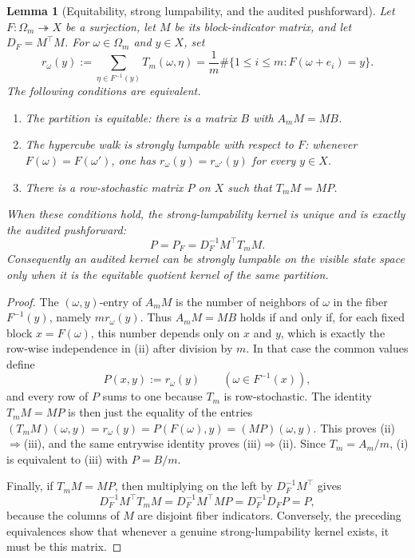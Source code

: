 \documentclass[12pt,a4paper]{article}
\theoremstyle{plain}
\newtheorem{lemma}[theorem]{Lemma}
\theoremstyle{definition}
\numberwithin{equation}{section}
\begin{document}
\begin{lemma}[Equitability, strong lumpability, and the audited pushforward]\label{lem:equitable-strong-lumpability-audited-pushforward}
Let \(F:\Omega_m\twoheadrightarrow X\) be a surjection, let \(M\) be its block-indicator matrix, and let \(D_F=M^\top M\).  For \(\omega\in\Omega_m\) and \(y\in X\), set
\[
 r_\omega(y):=\sum_{\eta\in F^{-1}(y)}T_m(\omega,\eta)
 =\frac{1}{m}\#\{1\le i\le m:F(\omega+e_i)=y\}.
\]
The following conditions are equivalent.
\begin{enumerate}[label=\textup{(\roman*)}]
\item The partition is equitable: there is a matrix \(B\) with \(A_mM=MB\).
\item The hypercube walk is strongly lumpable with respect to \(F\): whenever \(F(\omega)=F(\omega')\), one has \(r_\omega(y)=r_{\omega'}(y)\) for every \(y\in X\).
\item There is a row-stochastic matrix \(P\) on \(X\) such that \(T_mM=MP\).
\end{enumerate}
When these conditions hold, the strong-lumpability kernel is unique and is exactly the audited pushforward:
\[
P=P_F=D_F^{-1}M^\top T_mM.
\]
Consequently an audited kernel can be strongly lumpable on the visible state space only when it is the equitable quotient kernel of the same partition.
\end{lemma}
\begin{proof}
The \((\omega,y)\)-entry of \(A_mM\) is the number of neighbors of \(\omega\) in the fiber \(F^{-1}(y)\), namely \(m r_\omega(y)\).  Thus \(A_mM=MB\) holds if and only if, for each fixed block \(x=F(\omega)\), this number depends only on \(x\) and \(y\), which is exactly the row-wise independence in \textup{(ii)} after division by \(m\).  In that case the common values define
\[
P(x,y):=r_\omega(y)\qquad(\omega\in F^{-1}(x)),
\]
and every row of \(P\) sums to one because \(T_m\) is row-stochastic.  The identity \(T_mM=MP\) is then just the equality of the entries \((T_mM)(\omega,y)=r_\omega(y)=P(F(\omega),y)=(MP)(\omega,y)\).  This proves \textup{(ii)}\(\Rightarrow\)\textup{(iii)}, and the same entrywise identity proves \textup{(iii)}\(\Rightarrow\)\textup{(ii)}.  Since \(T_m=A_m/m\), \textup{(i)} is equivalent to \textup{(iii)} with \(P=B/m\).

Finally, if \(T_mM=MP\), then multiplying on the left by \(D_F^{-1}M^\top\) gives
\[
D_F^{-1}M^\top T_mM=D_F^{-1}M^\top MP=D_F^{-1}D_FP=P,
\]
because the columns of \(M\) are disjoint fiber indicators.  Conversely, the preceding equivalences show that whenever a genuine strong-lumpability kernel exists, it must be this matrix. \qedhere
\end{proof}
\end{document}
